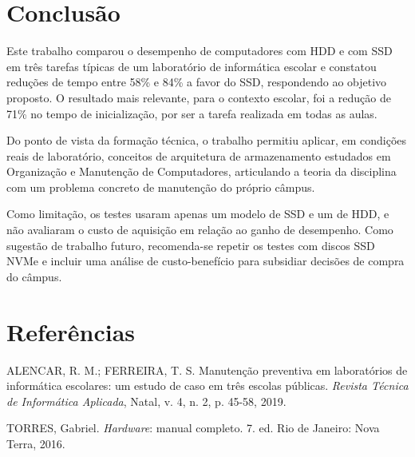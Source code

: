 \documentclass[article,12pt,a4paper,oneside]{abntex2}
\begin{document}
\section{Conclusão}

Este trabalho comparou o desempenho de computadores com HDD e com SSD em
três tarefas típicas de um laboratório de informática escolar e constatou
reduções de tempo entre 58\% e 84\% a favor do SSD, respondendo ao objetivo
proposto. O resultado mais relevante, para o contexto escolar, foi a redução
de 71\% no tempo de inicialização, por ser a tarefa realizada em todas as
aulas.

Do ponto de vista da formação técnica, o trabalho permitiu aplicar, em
condições reais de laboratório, conceitos de arquitetura de armazenamento
estudados em Organização e Manutenção de Computadores, articulando a teoria
da disciplina com um problema concreto de manutenção do próprio câmpus.

Como limitação, os testes usaram apenas um modelo de SSD e um de HDD, e não
avaliaram o custo de aquisição em relação ao ganho de desempenho. Como
sugestão de trabalho futuro, recomenda-se repetir os testes com discos SSD
NVMe e incluir uma análise de custo-benefício para subsidiar decisões de
compra do câmpus.

\postextual

\section*{Referências}

\newcommand{\referencia}[1]{\par\noindent\hangindent=1cm #1\par\medskip}

\referencia{ALENCAR, R. M.; FERREIRA, T. S. Manutenção preventiva em
laboratórios de informática escolares: um estudo de caso em três escolas
públicas. \textit{Revista Técnica de Informática Aplicada}, Natal, v. 4,
n. 2, p. 45-58, 2019.}

\referencia{TORRES, Gabriel. \textit{Hardware}: manual completo. 7. ed. Rio
de Janeiro: Nova Terra, 2016.}
\end{document}
